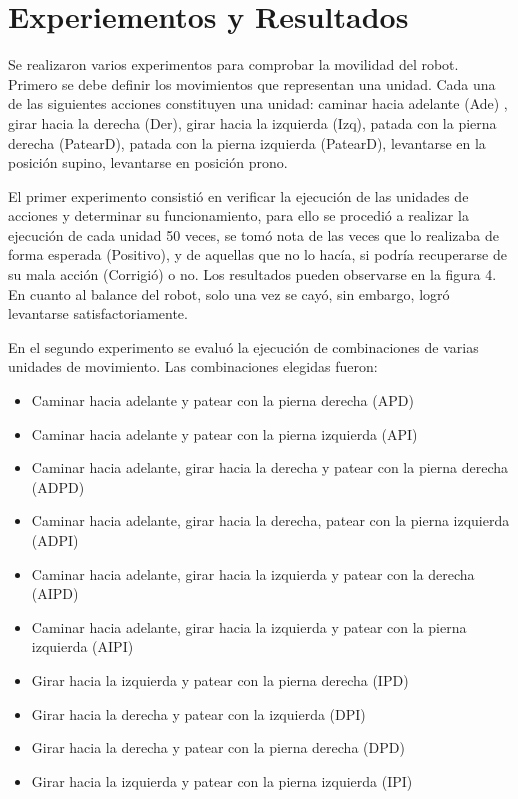 \chapter{Experiementos y Resultados}\label{chapter:resultados}

Se realizaron varios experimentos para comprobar la movilidad del robot. Primero se debe definir los movimientos que representan una unidad. Cada una de las siguientes acciones constituyen una unidad: caminar hacia adelante (Ade) , girar hacia la derecha (Der), girar hacia la izquierda (Izq), patada con la pierna derecha (PatearD), patada con la pierna izquierda (PatearD), levantarse en la posición supino, levantarse en posición prono.

El primer experimento consistió en verificar la ejecución de las unidades de acciones y determinar su funcionamiento, para ello se procedió a realizar la ejecución de cada unidad 50 veces, se tomó nota de las veces que lo realizaba de forma esperada (Positivo), y de aquellas que no lo hacía, si podría recuperarse de su mala acción (Corrigió) o no. Los resultados pueden observarse en la figura 4. En cuanto al balance del robot,  solo una vez se cayó, sin embargo, logró levantarse satisfactoriamente.

En el segundo experimento se evalu\'o la ejecuci\'on de  combinaciones de varias unidades de movimiento. Las combinaciones elegidas fueron:

\begin{itemize}
\setlength{\itemsep}{1pt}
\item Caminar hacia adelante y patear con la pierna derecha (APD)
\item Caminar hacia adelante y patear con la pierna izquierda (API)
\item Caminar hacia adelante, girar hacia la derecha y patear con la pierna derecha (ADPD)
\item Caminar hacia adelante, girar hacia la derecha, patear con la pierna izquierda (ADPI)
\item Caminar hacia adelante, girar hacia la izquierda y patear con la derecha (AIPD)
\item Caminar hacia adelante, girar hacia la  izquierda y  patear con la pierna izquierda (AIPI)
\item Girar hacia la izquierda y patear con la pierna derecha (IPD)
\item Girar hacia la derecha y patear con la izquierda (DPI)
\item Girar hacia la derecha y patear con la pierna derecha (DPD)
\item Girar hacia la izquierda y patear con la pierna izquierda (IPI)
\end{itemize}


